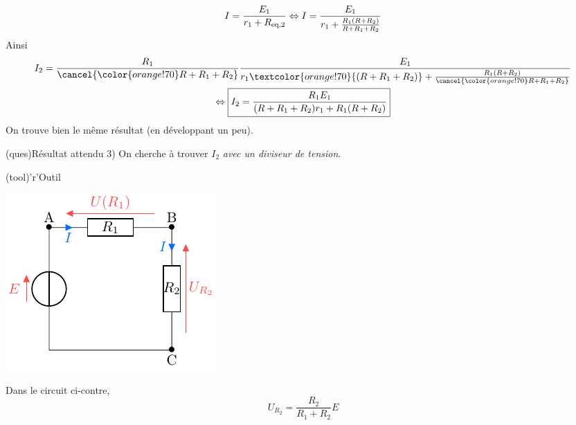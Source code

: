\documentclass[../../main/main.tex]{subfiles}
\begin{document}
{\begin{tcb}
\begin{equation*}
        I                 = \frac{E_1}{r_1 + R_{\rm eq,2}}
        \Leftrightarrow I = \frac{E_1}{r_1 + \frac{R_1(R+R_2)}{R + R_1 + R_2}}
    \end{equation*}
    Ainsi
    \begin{gather*}
        I_2 = \frac{R_1}{\cancel{\color{orange!70}R + R_1 + R_2}}
            \frac{E_1}{r_1 \textcolor{orange!70}{(R+R_1+R_2)}
                    + \frac{R_1(R+R_2)}{\cancel{\color{orange!70}R + R_1 +
                R_2}}}\\
        \Leftrightarrow \boxed{I_2 = \frac{R_1E_1}{(R+R_1+R_2)r_1 + R_1(R+R_2)}}
    \end{gather*}
    On trouve bien le même résultat (en développant un peu).
\end{tcb}

\begin{tcbraster}[raster columns=2, raster equal height=rows]
    \begin{tcb}[](ques){Résultat attendu}
        3) On cherche à trouver $I_2$ \textit{avec un diviseur de tension}.
    \end{tcb}
    \begin{tcb}[sidebyside, righthand ratio=.4](tool)'r'{Outil}
        \begin{center}
            \includegraphics[width=\linewidth]{divtens-rangle}
        \end{center}
        \tcblower
        \begin{center}
            Dans le circuit ci-contre,
            \[ U_{R_2} = \frac{R_2}{R_1+R_2}E\]

\end{center}
\end{tcb}
\end{tcbraster}}
\end{document}
